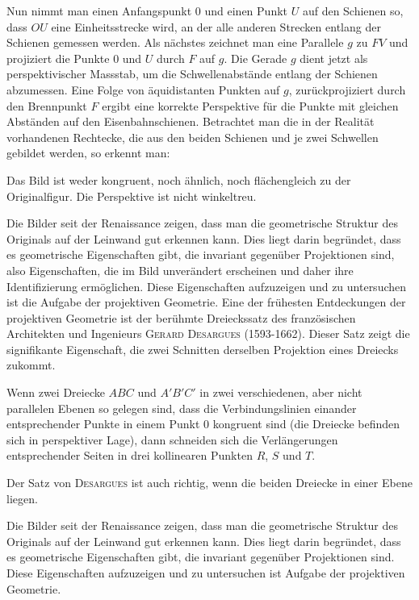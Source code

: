 \documentclass[%
11pt,%
twoside,%
titlepage,%
a4page,%
german,%
headsepline%
]{scrartcl}
\begin{document}
Nun nimmt man einen Anfangspunkt $0$ und einen Punkt $U$ auf den Schienen so, dass $OU$ eine Einheitsstrecke wird, an der alle anderen Strecken entlang der Schienen gemessen werden. Als n\"achstes zeichnet man eine Parallele $g$ zu $FV$ und projiziert die Punkte $0$ und $U$ durch $F$ auf $g$. Die Gerade $g$ dient jetzt als perspektivischer Massstab, um die Schwellenabst\"ande entlang der Schienen abzumessen. Eine Folge von \"aquidistanten Punkten auf $g$, zur\"uckprojiziert durch den Brennpunkt $F$ ergibt eine korrekte Perspektive f\"ur die Punkte mit gleichen Abst\"anden auf den Eisenbahnschienen.
Betrachtet man die in der Realit\"at vorhandenen Rechtecke, die aus den beiden Schienen und je zwei Schwellen gebildet werden, so erkennt man:

Das Bild ist weder kongruent, noch \"ahnlich, noch fl\"achengleich zu der Originalfigur.
Die Perspektive ist nicht winkeltreu.

Die Bilder seit der Renaissance zeigen, dass man die geometrische Struktur des Originals auf der Leinwand gut erkennen kann. Dies liegt darin begr\"undet, dass es geometrische Eigenschaften gibt, die invariant gegen\"uber Projektionen sind, also Eigenschaften, die im Bild unver\"andert erscheinen und daher ihre Identifizierung erm\"oglichen. Diese Eigenschaften aufzuzeigen und zu untersuchen ist die Aufgabe der projektiven Geometrie. Eine der fr\"uhesten Entdeckungen der projektiven Geometrie ist der ber\"uhmte Dreieckssatz des franz\"osischen Architekten und Ingenieurs \textsc{Gerard Desargues} (1593-1662). Dieser Satz zeigt die signifikante Eigenschaft, die zwei Schnitten derselben Projektion eines Dreiecks zukommt.

Wenn zwei Dreiecke $ABC$ und $A'B'C'$ in zwei verschiedenen, aber nicht parallelen Ebenen so gelegen sind, dass die Verbindungslinien einander entsprechender Punkte in einem Punkt $0$ kongruent sind (die Dreiecke befinden sich in perspektiver Lage), dann schneiden sich die Verl\"angerungen entsprechender Seiten in drei kollinearen Punkten $R$, $S$ und $T$.

Der Satz von \textsc{Desargues} ist auch richtig, wenn die beiden Dreiecke in einer Ebene liegen.

Die Bilder seit der Renaissance zeigen, dass man die geometrische Struktur des Originals auf der Leinwand gut erkennen kann. Dies liegt darin begr\"undet, dass es geometrische Eigenschaften gibt, die invariant gegen\"uber Projektionen sind. Diese Eigenschaften aufzuzeigen und zu untersuchen ist Aufgabe der projektiven Geometrie.
\end{document}
